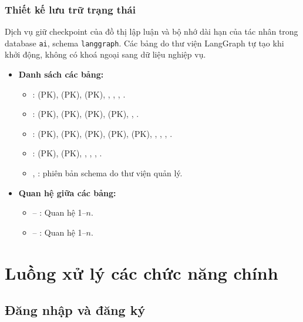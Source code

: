 \subsubsection{Thiết kế lưu trữ trạng thái}
Dịch vụ giữ checkpoint của đồ thị lập luận và bộ nhớ dài hạn của tác nhân trong database \texttt{ai}, schema \texttt{langgraph}. Các bảng do thư viện LangGraph tự tạo khi khởi động, không có khoá ngoại sang dữ liệu nghiệp vụ.
\begin{itemize}
\raggedright
  \item \textbf{Danh sách các bảng:}
  \begin{itemize}
    \item {}:  (PK),  (PK),  (PK), , , , .
    \item {}:  (PK),  (PK),  (PK),  (PK), , .
    \item {}:  (PK),  (PK),  (PK),  (PK),  (PK), , , , .
    \item {}:  (PK),  (PK), , , , .
    \item {}, : phiên bản schema do thư viện quản lý.
  \end{itemize}
  \item \textbf{Quan hệ giữa các bảng:}
  \begin{itemize}
    \item {} -- : Quan hệ 1--$n$.
    \item {} -- : Quan hệ 1--$n$.
  \end{itemize}
\end{itemize}

\section{Luồng xử lý các chức năng chính}

\subsection{Đăng nhập và đăng ký}

